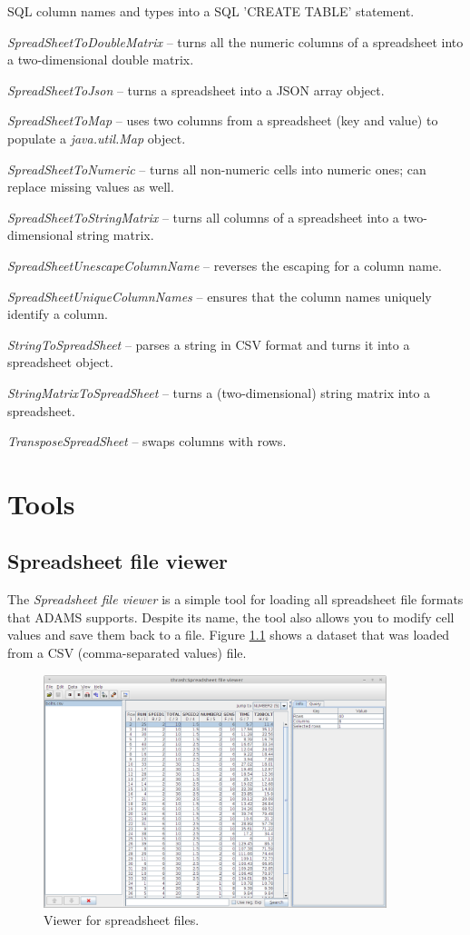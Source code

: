 \documentclass[a4paper]{book}
\begin{document}
\begin{tight_itemize}
	SQL column names and types into a SQL 'CREATE TABLE' statement.
	\item \textit{SpreadSheetToDoubleMatrix} -- turns all the numeric columns of
	a spreadsheet into a two-dimensional double matrix.
	\item \textit{SpreadSheetToJson} -- turns a spreadsheet into a JSON array object.
	\item \textit{SpreadSheetToMap} -- uses two columns from a spreadsheet
	(key and value) to populate a \textit{java.util.Map} object.
	\item \textit{SpreadSheetToNumeric} -- turns all non-numeric cells into numeric
	ones; can replace missing values as well.
	\item \textit{SpreadSheetToStringMatrix} -- turns all columns of
	a spreadsheet into a two-dimensional string matrix.
	\item \textit{SpreadSheetUnescapeColumnName} -- reverses the escaping for
	a column name.
	\item \textit{SpreadSheetUniqueColumnNames} -- ensures that the column
	names uniquely identify a column.
	\item \textit{StringToSpreadSheet} -- parses a string in CSV format and
	turns it into a spreadsheet object.
	\item \textit{StringMatrixToSpreadSheet} -- turns a (two-dimensional) 
	string matrix into a spreadsheet.
	\item \textit{TransposeSpreadSheet} -- swaps columns with rows.
\end{tight_itemize}

\chapter{Tools}
\section{Spreadsheet file viewer}
The \textit{Spreadsheet file viewer} is a simple tool for loading all spreadsheet
file formats that ADAMS supports. Despite its name, the tool also allows you to
modify cell values and save them back to a file. Figure \ref{spreadsheet-viewer} shows a
dataset that was loaded from a CSV (comma-separated values) file.

\begin{figure}[htb]
  \centering
  \includegraphics[width=10.0cm]{images/spreadsheet-viewer.png}
  \caption{Viewer for spreadsheet files.}
  \label{spreadsheet-viewer}
\end{figure}
\end{document}
